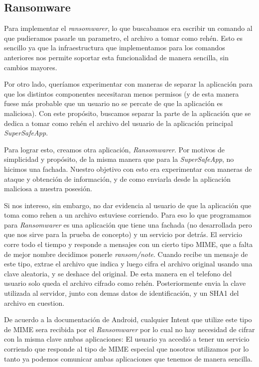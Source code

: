 \subsection{Ransomware}

Para implementar el \textit{ransomwarer}, lo que buscabamos era escribir un comando al que pudieramos pasarle un parametro, el archivo
a tomar como rehén. Esto es sencillo ya que la infraestructura que implementamos para los comandos anteriores nos permite soportar esta
funcionalidad de manera sencilla, sin cambios mayores.

Por otro lado, queríamos experimentar con maneras de separar la aplicación para que los distintos componentes necesitaran menos permisos
(y de esta manera fuese más probable que un usuario no se percate de que la aplicación es maliciosa). Con este propósito, buscamos separar
la parte de la aplicación que se dedica a tomar como rehén el archivo del usuario de la aplicación principal \textit{SuperSafeApp}.

Para lograr esto, creamos otra aplicación, \textit{Ransomwarer}. Por motivos de simplicidad y propósito, de la misma manera que para
la \textit{SuperSafeApp}, no hicimos una fachada. Nuestro objetivo con esto era experimentar con maneras de ataque y obtención de
información, y de como enviarla desde la aplicación maliciosa a nuestra posesión.

Si nos intereso, sin embargo, no dar evidencia al usuario de que la aplicación que toma como rehen a un archivo estuviese corriendo. Para
eso lo que programamos para \textit{Ransomwarer} es una aplicación que tiene una fachada (no desarrollada pero que nos sirve para la
prueba de concepto) y un servicio por detrás. El servicio corre todo el tiempo y responde a mensajes con un cierto tipo MIME, que a falta
de mejor nombre decidimos ponerle \textit{ransom/note}. Cuando recibe un mensaje de este tipo, extrae el archivo que indica y luego cifra
el archivo original usando una clave aleatoria, y se deshace del original. De esta manera en el telefono del usuario solo queda el archivo
cifrado como rehén. Posteriormente envia la clave utilizada al servidor, junto con demas datos de identificación, y un SHA1 del archivo
en cuestion.

De acuerdo a la documentaci\'on de Android, cualquier Intent que utilize este tipo de MIME sera recibida por el \textit{Ransomwarer} por lo cual
no hay necesidad de cifrar con la misma clave ambas aplicaciones: El usuario ya accedió a tener un servicio corriendo que responde al tipo de
MIME especial que nosotros utilizamos por lo tanto ya podemos comunicar ambas aplicaciones que tenemos de manera sencilla.

